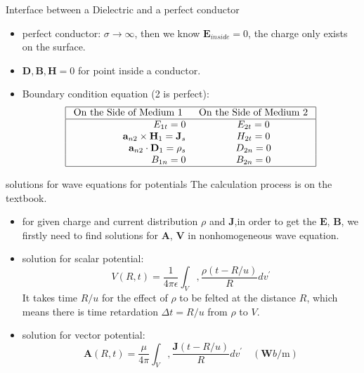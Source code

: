 \documentclass[xcolor={dvipsnames}]{beamer}
\begin{document}
\begin{frame}{Interface between a Dielectric and a perfect conductor}
\begin{itemize}
	\item perfect conductor: $\sigma\rightarrow\infty$, then we know $\mathbf{E}_{inside}=0$, the charge only exists on the surface.
	\item $\mathbf{D}, \mathbf{B}, \mathbf{H} = 0$ for point inside a conductor.
	\item Boundary condition equation (2 is perfect):
	$$
\begin{array}{|rc|}
\hline \text { On the Side of Medium 1 } & \text { On the Side of Medium 2 } \\
\hline E_{1 t}=0 & E_{2 t}=0 \\
\mathbf{a}_{n 2} \times \mathbf{H}_{1}=\mathbf{J}_{s} & H_{2 t}=0 \\
\mathbf{a}_{n 2} \cdot \mathbf{D}_{1}=\rho_{s} & D_{2 n}=0 \\
B_{1 n}=0 & B_{2 n}=0 \\
\hline
\end{array}
$$
\end{itemize}
\end{frame}
\begin{frame}{solutions for wave equations for potentials}
The calculation process is on the textbook.
\begin{itemize}
	\item for given charge and current distribution $\rho$ and $\textbf{J}$,in order to get the $\textbf{E}$, $\textbf{B}$, we firstly need to
find solutions for $\textbf{A}$, $\textbf{V}$ in nonhomogeneous wave equation.
\item solution for scalar potential:
$$
V(R, t)=\frac{1}{4 \pi \epsilon} \int_{V}, \frac{\rho(t-R / u)}{R} d v^{\prime}
$$
It takes time $R/u$ for the effect of $\rho$ to be felted at the distance $R$, which means there is time retardation $\Delta t=R/u$ from $\rho$ to $V$.
\item solution for vector potential:
$$
\mathbf{A}(R, t)=\frac{\mu}{4 \pi} \int_{V}, \frac{\mathbf{J}(t-R / u)}{R} d v^{\prime} \quad(\mathbf{W} b / \mathrm{m})
$$
\end{itemize}
\end{frame}
\end{document}

